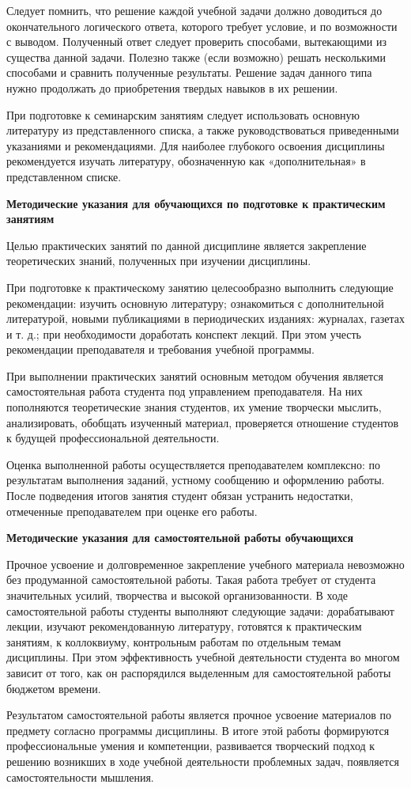 \documentclass[a4paper, 12pt]{article}
\begin{document}
Следует помнить, что решение каждой учебной задачи должно доводиться до  окончательного логического ответа, которого требует условие, и по возможности с выводом. Полученный ответ следует проверить способами, вытекающими из существа данной задачи. Полезно также (если возможно) решать несколькими способами и сравнить полученные результаты. Решение задач данного типа нужно продолжать до приобретения твердых навыков в их решении. 

При подготовке к семинарским занятиям следует использовать основную литературу из представленного списка, а также руководствоваться приведенными указаниями и рекомендациями. Для наиболее глубокого освоения дисциплины рекомендуется изучать литературу, обозначенную как «дополнительная» в представленном списке.

\vspace{8pt}
{\bf Методические указания для обучающихся по подготовке к практическим занятиям}

Целью практических занятий по данной дисциплине является закрепление теоретических знаний, полученных при изучении дисциплины. 

При подготовке к практическому занятию целесообразно выполнить следующие рекомендации: изучить основную литературу; ознакомиться с дополнительной литературой, новыми публикациями в периодических изданиях: журналах, газетах и т. д.; при необходимости доработать конспект лекций. При этом учесть рекомендации преподавателя и требования учебной программы.

При выполнении практических занятий основным методом обучения является самостоятельная работа студента под управлением преподавателя. На них пополняются теоретические знания студентов, их умение творчески мыслить, анализировать, обобщать изученный материал, проверяется отношение студентов к будущей профессиональной деятельности.

Оценка выполненной работы осуществляется преподавателем комплексно: по результатам выполнения заданий, устному сообщению и оформлению работы. После подведения итогов занятия студент обязан устранить недостатки, отмеченные преподавателем при оценке его работы.

\vspace{8pt}
{\bf Методические указания для самостоятельной работы обучающихся}

Прочное усвоение и долговременное закрепление учебного материала невозможно без продуманной самостоятельной работы. Такая работа требует от студента значительных усилий, творчества и высокой организованности. В ходе самостоятельной работы студенты выполняют следующие задачи: дорабатывают лекции, изучают рекомендованную литературу, готовятся к практическим занятиям, к коллоквиуму, контрольным работам по отдельным темам дисциплины. При этом эффективность учебной деятельности студента во многом зависит от того, как он распорядился выделенным для самостоятельной работы бюджетом времени.

Результатом самостоятельной работы является прочное усвоение материалов по предмету согласно программы дисциплины. В итоге этой работы формируются профессиональные умения и компетенции, развивается творческий подход к решению возникших в ходе учебной деятельности проблемных задач, появляется самостоятельности мышления.
\end{document}
